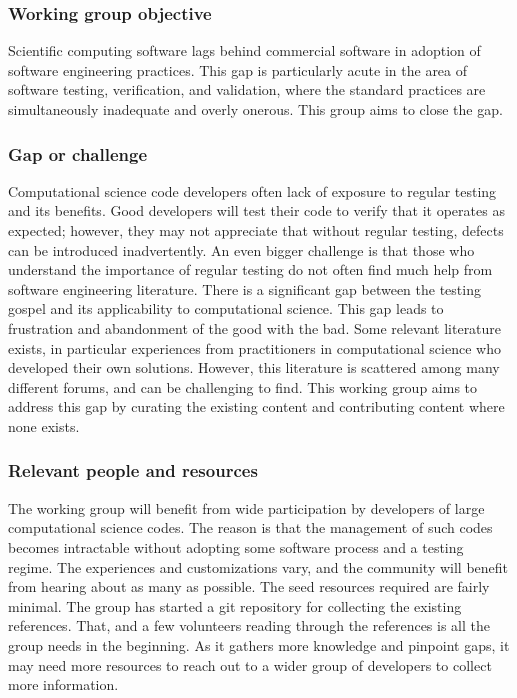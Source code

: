 \subsubsection{Working group objective}
Scientific computing software lags behind commercial software in
adoption of software engineering practices. This
gap is particularly acute in the area of software testing,
verification, and validation, where the standard practices are
simultaneously inadequate and overly onerous.
This group aims to close the gap.

\subsubsection{Gap or challenge}
Computational science code developers often lack of exposure to
regular testing and its benefits. Good developers will test their code to
verify that it operates as expected; however, they may not appreciate
that without regular testing, defects can be introduced
inadvertently. An even bigger challenge is that those who understand
the importance of regular testing do not often find much help from
software engineering literature. There is a significant gap between
the testing gospel and its applicability to computational science. This
gap leads to frustration and abandonment of the good with the bad. Some
relevant literature exists, in particular experiences from
practitioners in computational science who developed their own
solutions. However, this literature is scattered among many different
forums, and can be challenging to find. This working group aims to
address this gap by curating the existing content and contributing
content where none exists.

\subsubsection{Relevant people and resources}

The working group will benefit from wide participation by developers
of large computational science codes. The reason is that the
management of such codes becomes intractable without adopting some
software process and a testing regime. The experiences and
customizations vary, and the community will benefit from hearing about
as many as possible. The seed resources required are fairly
minimal. The group has started a git repository for collecting the
existing references. That, and a few volunteers reading through the
references is all the group needs in the beginning. As it gathers more
knowledge and pinpoint gaps, it may need more resources to reach out
to a wider group of developers to collect more information.

